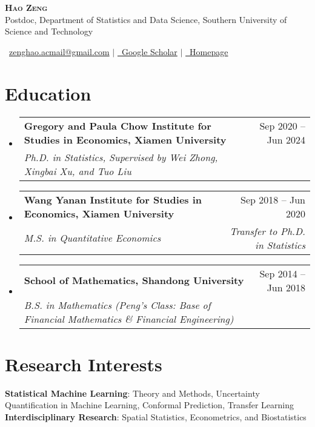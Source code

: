 \documentclass[letterpaper,10pt]{article}
\makeatletter
\newcommand{\resumeSubheading}[4]{
  \vspace{-2pt}\item
    \begin{tabular*}{0.97\textwidth}[t]{l@{\extracolsep{\fill}}r}
      \textbf{#1} & #2 \\
      \textit{\small#3} & \textit{\small #4} \\
    \end{tabular*}\vspace{-7pt}
}
\newcommand{\resumeSubHeadingListStart}{\begin{itemize}[leftmargin=0.15in, label={}]}
\newcommand{\resumeSubHeadingListEnd}{\end{itemize}}
\makeatother
\begin{document}
\begin{center}
    \textbf{\Huge \scshape Hao Zeng}
    \vspace{0.5em}\\
    {\small Postdoc, Department of Statistics and Data Science, Southern University of Science and Technology}
\end{center}

\begin{center}
    \small \faEnvelope\ \href{mailto:zenghao.acmail@gmail.com}{zenghao.acmail@gmail.com} $|$
    \href{https://scholar.google.com/citations?user=-EiBHeIAAAAJ&hl=en}{\faGraduationCap\ Google Scholar} $|$
    \href{https://zenghao-stat.github.io}{\faHome\ Homepage}
\end{center}

\section{Education}
  \resumeSubHeadingListStart
    \resumeSubheading
      {Gregory and Paula Chow Institute for Studies in Economics, Xiamen University}{Sep 2020 -- Jun 2024}
      {Ph.D. in Statistics, Supervised by Wei Zhong, Xingbai Xu, and Tuo Liu}{}
    
    \resumeSubheading
      {Wang Yanan Institute for Studies in Economics, Xiamen University}{Sep 2018 -- Jun 2020}
      {M.S. in Quantitative Economics}{Transfer to Ph.D. in Statistics}
    
    \resumeSubheading
      {School of Mathematics, Shandong University}{Sep 2014 -- Jun 2018}
      {B.S. in Mathematics (Peng's Class: Base of Financial Mathematics \& Financial Engineering)}{}
  \resumeSubHeadingListEnd


\section{Research Interests}
 \begin{itemize}[leftmargin=0.15in, label={}]
    \small{\item{
     \textbf{Statistical Machine Learning}{: Theory and Methods, Uncertainty Quantification in Machine Learning, Conformal Prediction, Transfer Learning} \\
     \textbf{Interdisciplinary Research}{: Spatial Statistics, Econometrics, and Biostatistics}
    }}
 \end{itemize}
\end{document}

